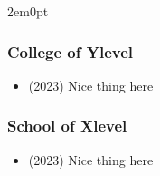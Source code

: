 \documentclass[11pt]{article}
\renewcommand{\myschool}{School of X}
\renewcommand{\mycollege}{College of Y}
\begin{document}
\begin{adjustwidth}{2em}{0pt}
\subsubsection{\mycollege level}

\begin{itemize}
    \item (2023) Nice thing here 
\end{itemize}

\subsubsection{\myschool level}

\begin{itemize}
    \item (2023) Nice thing here 
\end{itemize}

\end{adjustwidth}
\end{document}
